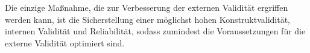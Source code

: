 Die einzige Maßnahme, die zur Verbesserung der externen Validität ergriffen werden kann, ist die Sicherstellung einer möglichst hohen Konstruktvalidität, internen Validität und Reliabilität, sodass zumindest die Voraussetzungen für die externe Validität optimiert sind.

%
%
%
%
%
%
%
%
